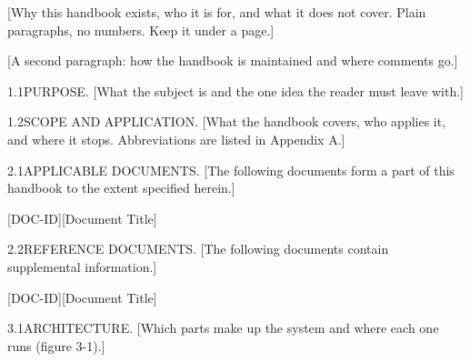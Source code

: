 \documentclass[handbook]{nasa-handbook} %
\begin{document}
\nhcover

\begin{nhhistory}
  \nhhist{}{}{}{}
  \nhhist{}{}{}{}
\end{nhhistory}

\nhcontents

[Why this handbook exists, who it is for, and what it does not cover. Plain paragraphs, no numbers. Keep it under a page.]

[A second paragraph: how the handbook is maintained and where comments go.]


\begin{nhpara}{1.1}{PURPOSE.}
[What the subject is and the one idea the reader must leave with.]
\end{nhpara}

\begin{nhpara}{1.2}{SCOPE AND APPLICATION.}
[What the handbook covers, who applies it, and where it stops. Abbreviations are listed in Appendix A.]
\end{nhpara}



\begin{nhpara}{2.1}{APPLICABLE DOCUMENTS.}
[The following documents form a part of this handbook to the extent specified herein.]

[DOC-ID]\hspace{6mm}[Document Title]
\end{nhpara}

\begin{nhpara}{2.2}{REFERENCE DOCUMENTS.}
[The following documents contain supplemental information.]

[DOC-ID]\hspace{6mm}[Document Title]
\end{nhpara}


\begin{nhpara}{3.1}{ARCHITECTURE.}
[Which parts make up the system and where each one runs (figure 3-1).]
\end{nhpara}
\end{document}
